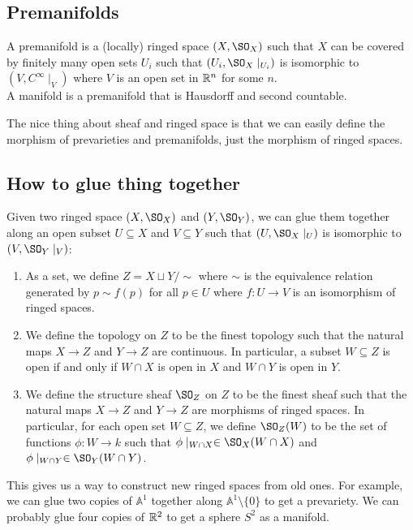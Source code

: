 \documentclass[12pt]{scrartcl}
\newcommand{\A}{\mathbb{A}}
\begin{document}
\subsection{Premanifolds}
\begin{definition}
    A premanifold is a (locally) ringed space $(X,\SO_X)$ such that $X$ can be covered by finitely many open sets $U_i$ such that $(U_i,\SO_X\mid_{U_i})$ is isomorphic to $(V,C^\infty\mid_V)$ where $V$ is an open set in $\mathbb R^n$ for some $n$.
    \\

    A manifold is a premanifold that is Hausdorff and second countable.
\end{definition}

The nice thing about sheaf and ringed space is that we can easily define the morphism of prevarieties and premanifolds, just the morphism of ringed spaces.

\subsection{How to glue thing together}
Given two ringed space $(X,\SO_X)$ and $(Y,\SO_Y)$, we can glue them together along an open subset $U\subseteq X$ and $V\subseteq Y$ such that $(U,\SO_X\mid_U)$ is isomorphic to $(V,\SO_Y\mid_V)$: 
\begin{enumerate}
    \item As a set, we define $Z=X\sqcup Y/\sim$ where $\sim$ is the equivalence relation generated by $p\sim f(p)$ for all $p\in U$ where $f:U\to V$ is an isomorphism of ringed spaces.
    \item We define the topology on $Z$ to be the finest topology such that the natural maps $X\to Z$ and $Y\to Z$ are continuous. In particular, a subset $W\subseteq Z$ is open if and only if $W\cap X$ is open in $X$ and $W\cap Y$ is open in $Y$.
    \item We define the structure sheaf $\SO_Z$ on $Z$ to be the finest sheaf such that the natural maps $X\to Z$ and $Y\to Z$ are morphisms of ringed spaces. In particular, for each open set $W\subseteq Z$, we define $\SO_Z(W)$ to be the set of functions $\phi:W\to k$ such that $\phi\mid_{W\cap X}\in \SO_X(W\cap X)$ and $\phi\mid_{W\cap Y}\in \SO_Y(W\cap Y)$.
\end{enumerate}

This gives us a way to construct new ringed spaces from old ones. For example, we can glue two copies of $\A^1$ together along $\A^1\setminus \{0\}$ to get a prevariety. We can probably glue four copies of $\mathbb R^2$ to get a sphere $S^2$ as a manifold. 
\end{document}
